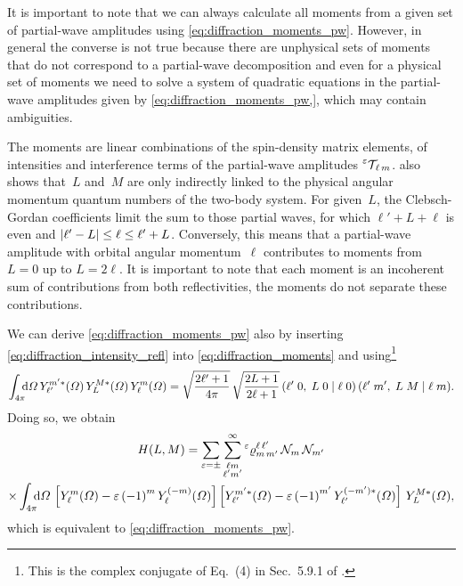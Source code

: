 It is important to note that we can always calculate all moments from
a given set of partial-wave amplitudes using
\cref{eq:diffraction_moments_pw}.  However, in general the converse is
not true because there are unphysical sets of moments that do not
correspond to a partial-wave decomposition and even for a physical set
of moments we need to solve a system of quadratic equations in the
partial-wave amplitudes given by \cref{eq:diffraction_moments_pw,},
which may contain ambiguities.

The moments are linear combinations of the spin-density matrix
elements, \ie of intensities and interference terms of the
partial-wave amplitudes $\prescript{\ensuremath{\varepsilon}}{}{\mathcal{T\!}}_{\ell\,
m}$.   also shows that~$L$ and~$M$ are
only indirectly linked to the physical angular momentum quantum
numbers of the two-body system.  For given~$L$, the Clebsch-Gordan
coefficients limit the sum to those partial waves, for which $\ell' +
L + \ell$ is even and $\vert{\ell' - L}\vert \leq \ell \leq \ell' + L$.
Conversely, this means that a partial-wave amplitude with orbital
angular momentum~$\ell$ contributes to moments from $L = 0$ up to $L =
2 \ell$.  It is important to note that each moment is an incoherent
sum of contributions from both reflectivities, \ie the moments do not
separate these contributions.

We can derive \cref{eq:diffraction_moments_pw} also by inserting
\cref{eq:diffraction_intensity_refl} into
\cref{eq:diffraction_moments} and using\footnote{This is the complex
conjugate of Eq.~(4) in Sec.~5.9.1 of .}
\begin{equation}
  \label{eq:spherical_harm_clebsch}
  \int_{4 \pi}\!\!\! \dif{\Omega}\,
  Y_{\ell'}^{m' *}(\Omega)\, Y_L^{M *}(\Omega)\, Y_{\ell}^m(\Omega)
  = \sqrt{\frac{2 \ell' + 1}{4 \pi}}\, \sqrt{\frac{2 L + 1}{2 \ell + 1}}\, \clebsch{\ell'}{0}{L}{0}{\ell}{0}\, \clebsch{\ell'}{m'}{L}{M}{\ell}{m}.
\end{equation}
Doing so, we obtain
\begin{multline}
  \label{eq:diffraction_moments_pw_refl}
  H(L, M)
  = \sum_{\refl = \pm} \sum_{\substack{\ell m \\ \ell' m'}}^\infty
  \prescript{\refl}{}{\varrho}^{\ell\, \ell'}_{m\, m'}\,
  \mathcal{N}_m\, \mathcal{N}_{m'} \\
  \times \int_{4 \pi}\!\!\! \dif{\Omega}\,
  \sBrk[2]{Y_\ell^m(\Omega) - \refl\, {(-1)}^m\, Y_\ell^{(-m)}(\Omega)}
  \sBrk[2]{Y_{\ell'}^{m' *}(\Omega) - \refl\, {(-1)}^{m'}\, Y_{\ell'}^{(-m') *}(\Omega)}\,
  Y_L^{M *}(\Omega),
\end{multline}
which is equivalent to \cref{eq:diffraction_moments_pw}.


